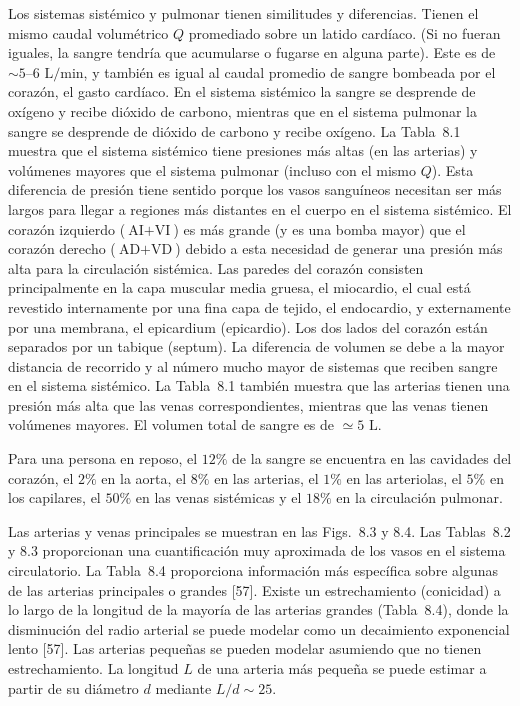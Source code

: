 \documentclass[12pt]{book}
\begin{document}
Los sistemas sistémico y pulmonar tienen similitudes y diferencias. Tienen el mismo caudal volumétrico $Q$ promediado sobre un latido cardíaco. (Si no fueran iguales, la sangre tendría que acumularse o fugarse en alguna parte). Este es de ${\sim}5\text{--}6\text{ L/min}$, y también es igual al caudal promedio de sangre bombeada por el corazón, el gasto cardíaco. En el sistema sistémico la sangre se desprende de oxígeno y recibe dióxido de carbono, mientras que en el sistema pulmonar la sangre se desprende de dióxido de carbono y recibe oxígeno. La Tabla~8.1 muestra que el sistema sistémico tiene presiones más altas (en las arterias) y volúmenes mayores que el sistema pulmonar (incluso con el mismo $Q$). Esta diferencia de presión tiene sentido porque los vasos sanguíneos necesitan ser más largos para llegar a regiones más distantes en el cuerpo en el sistema sistémico. El corazón izquierdo ($\text{AI} + \text{VI}$) es más grande (y es una bomba mayor) que el corazón derecho ($\text{AD} + \text{VD}$) debido a esta necesidad de generar una presión más alta para la circulación sistémica. Las paredes del corazón consisten principalmente en la capa muscular media gruesa, el miocardio, el cual está revestido internamente por una fina capa de tejido, el endocardio, y externamente por una membrana, el epicardium (epicardio). Los dos lados del corazón están separados por un tabique (septum). La diferencia de volumen se debe a la mayor distancia de recorrido y al número mucho mayor de sistemas que reciben sangre en el sistema sistémico. La Tabla~8.1 también muestra que las arterias tienen una presión más alta que las venas correspondientes, mientras que las venas tienen volúmenes mayores. El volumen total de sangre es de $\simeq 5\text{ L}$.

Para una persona en reposo, el $12\%$ de la sangre se encuentra en las cavidades del corazón, el $2\%$ en la aorta, el $8\%$ en las arterias, el $1\%$ en las arteriolas, el $5\%$ en los capilares, el $50\%$ en las venas sistémicas y el $18\%$ en la circulación pulmonar.

Las arterias y venas principales se muestran en las Figs.~8.3 y 8.4. Las Tablas~8.2 y 8.3 proporcionan una cuantificación muy aproximada de los vasos en el sistema circulatorio. La Tabla~8.4 proporciona información más específica sobre algunas de las arterias principales o grandes [57]. Existe un estrechamiento (conicidad) a lo largo de la longitud de la mayoría de las arterias grandes (Tabla~8.4), donde la disminución del radio arterial se puede modelar como un decaimiento exponencial lento [57]. Las arterias pequeñas se pueden modelar asumiendo que no tienen estrechamiento. La longitud $L$ de una arteria más pequeña se puede estimar a partir de su diámetro $d$ mediante $L/d \sim 25$.
\end{document}
